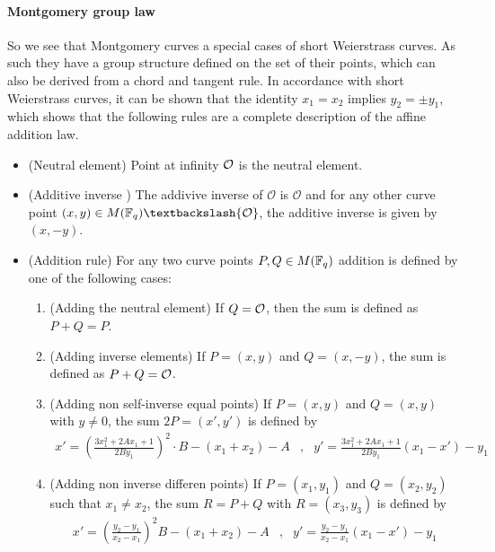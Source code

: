 \paragraph{Montgomery group law} So we see that Montgomery curves a special cases of short Weierstrass curves. As such they have a group structure defined on the set of their points, which can also be derived from a chord and tangent rule. In accordance with short Weierstrass curves, it can be shown that the identity $x_1=x_2$ implies $y_2=\pm y_1$, which shows that the following rules are a complete description of the affine addition law.
\begin{itemize}
\item (Neutral element) Point at infinity $\mathcal{O}$ is the neutral element.
\item (Additive inverse ) The addivive inverse of $\mathcal{O}$ is $\mathcal{O}$ and for any other curve point $(x,y) \in M(\F_q)\textbackslash \{\mathcal{O}\}$, the additive inverse is given by $(x,-y)$.
\item (Addition rule) For any two curve points $P, Q \in M(\mathbb{F}_q)$ addition is defined by one of the following cases:
\begin{enumerate}
\item (Adding the neutral element) If $Q=\mathcal{O}$, then the sum is defined as $P+Q=P$.
\item (Adding inverse elements)  If $P=(x,y)$ and $Q=(x,-y)$, the sum is defined as $P+Q=\mathcal{O}$.
\item (Adding non self-inverse equal points) If $P=(x,y)$ and $Q=(x,y)$ with $y\neq 0$, the sum $2P=(x',y')$ is defined by
$$
\begin{array}{llr}
x' = (\frac{3x_1^2 + 2A x_1 +1}{2By_1})^2\cdot B - (x_1 + x_2) - A &,&
y' = \frac{3x_1^2 + 2A x_1 +1}{2By_1}(x_1-x') - y_1
\end{array} 
$$
\item (Adding non inverse differen points) If $P=(x_1,y_1)$ and $Q=(x_2,y_2)$ such that $x_1 \neq x_2$, the sum $R=P+Q$ with $R=(x_3,y_3)$ is defined by
$$
\begin{array}{llr}
x' = (\frac{y_2-y_1}{x_2-x_1})^2B - (x_1 + x_2) - A &, &
y' = \frac{y_2-y_1}{x_2-x_1}(x_1-x') - y_1
\end{array} 
$$
\end{enumerate}
\end{itemize} 
